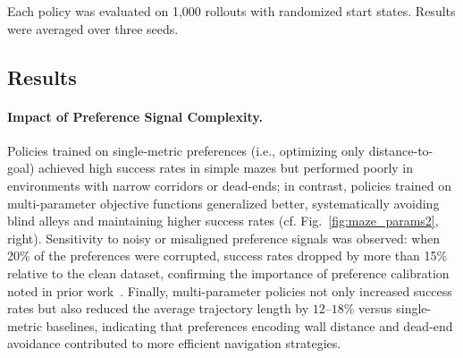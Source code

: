 \documentclass[a4paper,oneside,10pt,ngerman,english]{scrartcl}
\begin{document}
Each policy was evaluated on 1,000 rollouts with randomized start states. 
Results were averaged over three seeds.

\subsection{Results}

\paragraph{Impact of Preference Signal Complexity.}
Policies trained on single-metric preferences (i.e., optimizing only distance-to-goal) achieved high success rates in simple mazes but performed poorly in environments with narrow corridors or dead-ends; in contrast, policies trained on multi-parameter objective functions generalized better, systematically avoiding blind alleys and maintaining higher success rates (cf. Fig.~\ref{fig:maze_params2}, right). Sensitivity to noisy or misaligned preference signals was observed: when 20\% of the preferences were corrupted, success rates dropped by more than 15\% relative to the clean dataset, confirming the importance of preference calibration noted in prior work~\cite{rafailov2023direct}. Finally, multi-parameter policies not only increased success rates but also reduced the average trajectory length by $12$--$18$\% versus single-metric baselines, indicating that preferences encoding wall distance and dead-end avoidance contributed to more efficient navigation strategies.
\end{document}
